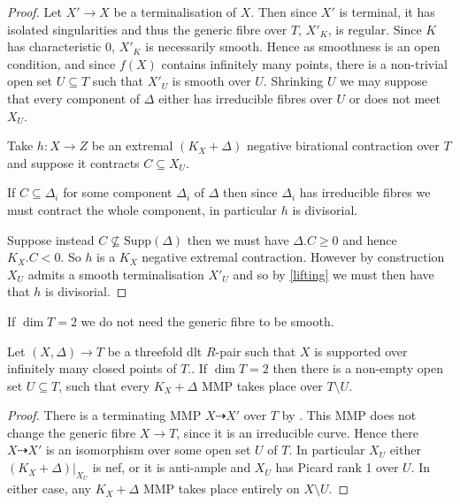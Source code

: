 	\begin{proof}
		
		Let $X' \to X$ be a terminalisation of $X$. Then since $X'$ is terminal, it has isolated singularities and thus the generic fibre over $T$, $X'_{K}$, is regular. Since $K$ has characteristic $0$, $X'_{K}$ is necessarily smooth. Hence as smoothness is an open condition, and since $f(X)$ contains infinitely many points, there is a non-trivial open set $U \subseteq T$ such that $X'_{U}$ is smooth over $U$. Shrinking $U$ we may suppose that every component of $\Delta$ either has irreducible fibres over $U$ or does not meet $X_{U}$. 
		
		Take $h:X \to Z$ be an extremal $(K_{X}+\Delta)$ negative birational contraction over $T$ and suppose it contracts $C \subseteq X_{U}$. 
		
		If $C \subseteq \Delta_{i}$ for some component $\Delta_{i}$ of $\Delta$ then since $\Delta_{i}$ has irreducible fibres we must contract the whole component, in particular $h$ is divisorial.
		
		Suppose instead $C \nsubseteq \text{Supp}(\Delta)$ then we must have $\Delta.C \geq 0$ and hence $K_{X}.C < 0$. So $h$ is a $K_{X}$ negative extremal contraction. However by construction $X_{U}$ admits a smooth terminalisation $X'_{U}$ and so by \autoref{lifting} we must then have that $h$ is divisorial.
	\end{proof}

	If $\dim T =2$ we do not need the generic fibre to be smooth.

	\begin{lemma}\label{open-2}
	Let $(X,\Delta) \to T$ be a threefold dlt $R$-pair such that $X$ is supported over infinitely many closed points of $T$.. If $\dim T=2$ then there is a non-empty open set $U \subseteq T$, such that every $K_{X}+\Delta$ MMP takes place over $T \setminus U$.
	\end{lemma}

	\begin{proof}
		
		There is a terminating MMP $X \dashrightarrow X'$ over $T$ by \cite[Theorem F]{bhatt2020}. This MMP does not change the generic fibre $X \to T$, since it is an irreducible curve. Hence there $X \dashrightarrow X'$ is an isomorphism over some open set $U$ of $T$. In particular $X_{U}$ either $(K_{X}+\Delta)|_{X_{U}}$ is nef, or it is anti-ample and $X_{U}$ has Picard rank 1 over $U$. In either case, any $K_{X}+\Delta$ MMP takes place entirely on $X\setminus U$. 
				
	\end{proof}

